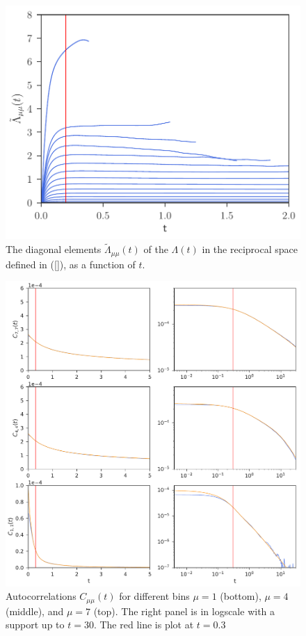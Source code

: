 \documentclass[b5paper,openright,11pt]{book}
\begin{document}
\begin{figure}[h!]
  \centering
\includegraphics[scale=0.41]{LambdatRec-WALLS-17nodes}
\caption[Diagonal elements  $\tilde{\Lambda}_{\mu\mu}(t)$ of $\Lambda(t)$ in the reciprocal space - 17nodes.]{The  diagonal elements  $\tilde{\Lambda}_{\mu\mu}(t)$ of  the
  $\Lambda(t)$ in the reciprocal space defined in (\ref{}), as a
  function of $t$.}
\label{fig:LambdatRec-WALLS-17nodes}
\end{figure}

\begin{figure}[h!]
  \centering
\includegraphics[width=\linewidth]{Predictions-WALLS-17nodes}
\caption[Predicted autocorrelations of $C(t)$ for 17 nodes.] {Autocorrelations $C_{\mu\mu}(t)$  for different  bins $\mu=1$
  (bottom),  $\mu=4$  (middle),  and  $\mu=7$ (top).  The  right panel  is  in 
  logscale with a support up to $t=30$. The red line is plot at $t=0.3$}
\label{fig:Predictions-WALLS-17nodes}
\end{figure}
\end{document}

